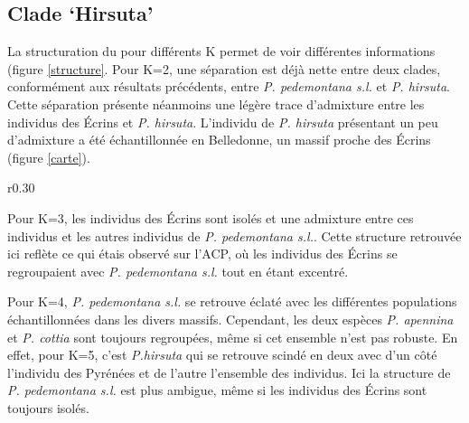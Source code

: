 \subsection{Clade `Hirsuta'}

La structuration du  pour différents K permet de voir différentes informations (figure \ref{structure}. Pour K=2, une séparation est déjà nette entre deux clades, conformément aux résultats précédents, entre \textit{P. pedemontana s.l.} et \textit{P. hirsuta}. Cette séparation présente néanmoins une légère trace d'admixture entre les individus des Écrins et \textit{P. hirsuta}. L'individu de \textit{P. hirsuta} présentant un peu d'admixture a été échantillonnée en Belledonne, un massif proche des Écrins (figure \ref{carte}).

\begin{wrapfigure}{r}{0.30\textwidth}
	\vspace{-40pt}
	\begin{center}
	\end{center}
	\vspace{-20pt}
	\caption{\textbf{structure} snmf pour k de 2 a 5}
    \label{structure}
\end{wrapfigure}

Pour K=3, les individus des Écrins sont isolés et une admixture entre ces individus et les autres individus de \textit{P. pedemontana s.l.}. Cette structure retrouvée ici reflète ce qui étais observé sur l'ACP, où les individus des Écrins se regroupaient avec \textit{P. pedemontana s.l.} tout en étant excentré.

Pour K=4, \textit{P. pedemontana s.l.} se retrouve éclaté avec les différentes populations échantillonnées dans les divers massifs. Cependant, les deux espèces \textit{P. apennina} et \textit{P. cottia} sont toujours regroupées, même si cet ensemble n'est pas robuste. En effet, pour K=5, c'est \textit{P.hirsuta} qui se retrouve scindé en deux avec d'un côté l'individu des Pyrénées et de l'autre l'ensemble des individus. Ici la structure de \textit{P. pedemontana s.l.} est plus ambigue, même si les individus des Écrins sont toujours isolés.


